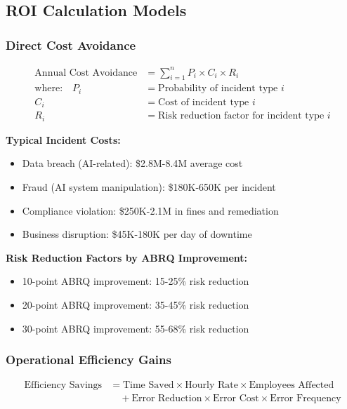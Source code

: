 \documentclass[11pt,a4paper]{article}
\begin{document}
\subsection{ROI Calculation Models}

\subsubsection{Direct Cost Avoidance}

\begin{align}
\text{Annual Cost Avoidance} &= \sum_{i=1}^{n} P_i \times C_i \times R_i \\
\text{where:} \quad P_i &= \text{Probability of incident type } i \\
C_i &= \text{Cost of incident type } i \\
R_i &= \text{Risk reduction factor for incident type } i
\end{align}

\textbf{Typical Incident Costs:}
\begin{itemize}
\item Data breach (AI-related): \$2.8M-8.4M average cost
\item Fraud (AI system manipulation): \$180K-650K per incident
\item Compliance violation: \$250K-2.1M in fines and remediation
\item Business disruption: \$45K-180K per day of downtime
\end{itemize}

\textbf{Risk Reduction Factors by ABRQ Improvement:}
\begin{itemize}
\item 10-point ABRQ improvement: 15-25\% risk reduction
\item 20-point ABRQ improvement: 35-45\% risk reduction
\item 30-point ABRQ improvement: 55-68\% risk reduction
\end{itemize}

\subsubsection{Operational Efficiency Gains}

\begin{align}
\text{Efficiency Savings} &= \text{Time Saved} \times \text{Hourly Rate} \times \text{Employees Affected} \\
&\quad + \text{Error Reduction} \times \text{Error Cost} \times \text{Error Frequency}
\end{align}
\end{document}
